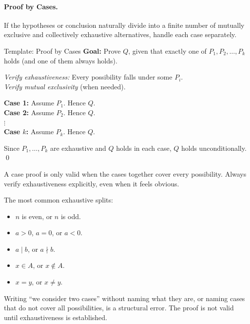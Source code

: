 \paragraph{Proof by Cases.}

If the hypotheses or conclusion naturally divide into a finite number
of mutually exclusive and collectively exhaustive alternatives, handle
each case separately.

\begin{propositionbox}{Template: Proof by Cases}
\textbf{Goal:} Prove $Q$, given that exactly one of $P_1, P_2, \ldots, P_k$
holds (and one of them always holds).

\medskip
\textit{Verify exhaustiveness:} Every possibility falls under some $P_i$.\\
\textit{Verify mutual exclusivity} (when needed).

\medskip
\textbf{Case 1:} Assume $P_1$. \quad [Argue.] \quad Hence $Q$.\\[4pt]
\textbf{Case 2:} Assume $P_2$. \quad [Argue.] \quad Hence $Q$.\\[4pt]
\hspace{1.2em}$\vdots$\\[4pt]
\textbf{Case $k$:} Assume $P_k$. \quad [Argue.] \quad Hence $Q$.

\medskip
Since $P_1, \ldots, P_k$ are exhaustive and $Q$ holds in each case,
$Q$ holds unconditionally. \qed
\end{propositionbox}

\begin{remark}
A case proof is only valid when the cases together cover every
possibility. Always verify exhaustiveness explicitly, even when it
feels obvious.

The most common exhaustive splits:
\begin{itemize}[itemsep=2pt]
  \item $n$ is even, or $n$ is odd.
  \item $a > 0$, $a = 0$, or $a < 0$.
  \item $a \mid b$, or $a \nmid b$.
  \item $x \in A$, or $x \notin A$.
  \item $x = y$, or $x \neq y$.
\end{itemize}

Writing ``we consider two cases'' without naming what they are, or
naming cases that do not cover all possibilities, is a structural error.
The proof is not valid until exhaustiveness is established.
\end{remark}

